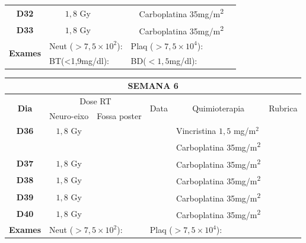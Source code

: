 \documentclass[11pt,a4paper,oldfontcommands]{memoir}
\begin{document}
\begin{center}
\begin{longtable}{p{1cm}p{2cm}|p{2cm}|p{1cm}|p{4cm}|p{3cm}}
    \multicolumn{1}{c|}{\multirow{1}{*}{\textbf{D32}}}&\multicolumn{1}{c|}{\(1,8\) Gy}&&&{Carboplatina 35mg/m\textsuperscript{2}}&\\
    \multicolumn{1}{c|}{\multirow{1}{*}{\textbf{D33}}}&\multicolumn{1}{c|}{\(1,8\) Gy}&&&{Carboplatina 35mg/m\textsuperscript{2}}&\\
    \hline
    \multicolumn{1}{c|}{\multirow{2}{*}{\textbf{Exames}}}&\multicolumn{2}{l|}{Neut (\(>7,5\times10^2\)):}&\multicolumn{2}{l|}{Plaq (\(>7,5\times10^4\)):}&\\
    \cline{2-6}
    \multicolumn{1}{c|}{\multirow{2}{*}{{}}}&\multicolumn{2}{l|}{BT(<1,9mg/dl):}&\multicolumn{2}{l|}{BD(\(<1,5\)mg/dl):}&
    \\
    \hline
\end{longtable}
\clearpage
\begin{longtable}{p{1cm}p{2cm}|p{2cm}|p{1cm}|p{4cm}|p{3cm}}
	\hline
	\multicolumn{6}{c}{\textbf{SEMANA 6}}\\
\hline
    \multicolumn{1}{c|}{\multirow{2}{*}{\textbf{Dia}}}&\multicolumn{2}{c|}{Dose RT}&\multicolumn{1}{c|}{\multirow{2}{*}{Data}}&\multicolumn{1}{c|}{\multirow{2}{*}{Quimioterapia}}&\multicolumn{1}{c}{\multirow{2}{*}{Rubrica}} \\
    \cline{2-3}
    \multicolumn{1}{c|}{\multirow{1}{*}{}}&{Neuro-eixo}&{Fossa poster}&& \\
	\hline
	\multicolumn{1}{c|}{\multirow{1}{*}{\textbf{D36}}}&\multicolumn{1}{c|}{\(1,8\) Gy}&&&{Vincristina \(1,5\) mg/m\(^2\)}&\\
	\multicolumn{1}{c|}{\multirow{1}{*}{\textbf{}}}&\multicolumn{1}{c|}{}&&&{Carboplatina 35mg/m\textsuperscript{2}}&\\
    \multicolumn{1}{c|}{\multirow{1}{*}{\textbf{D37}}}&\multicolumn{1}{c|}{\(1,8\) Gy}&&&{Carboplatina 35mg/m\textsuperscript{2}}&\\
    \multicolumn{1}{c|}{\multirow{1}{*}{\textbf{D38}}}&\multicolumn{1}{c|}{\(1,8\) Gy}&&&{Carboplatina 35mg/m\textsuperscript{2}}&\\
    \multicolumn{1}{c|}{\multirow{1}{*}{\textbf{D39}}}&\multicolumn{1}{c|}{\(1,8\) Gy}&&&{Carboplatina 35mg/m\textsuperscript{2}}&\\
    \multicolumn{1}{c|}{\multirow{1}{*}{\textbf{D40}}}&\multicolumn{1}{c|}{\(1,8\) Gy}&&&{Carboplatina 35mg/m\textsuperscript{2}}&\\
    \hline
    \multicolumn{1}{c|}{\multirow{2}{*}{\textbf{Exames}}}&\multicolumn{2}{l|}{Neut (\(>7,5\times10^2\)):}&\multicolumn{2}{l|}{Plaq (\(>7,5\times10^4\)):}&\\

\end{longtable}
\end{center}
\end{document}
